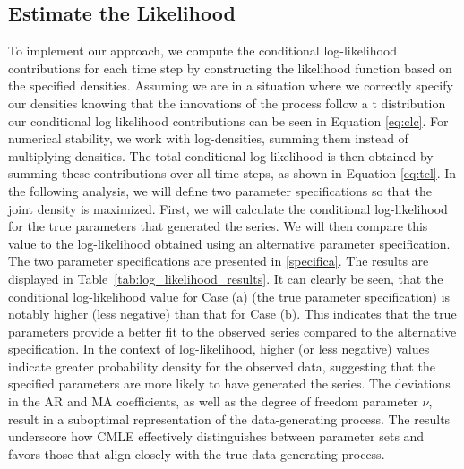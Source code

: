 \documentclass[12pt]{article}
\begin{document}
 \subsection{Estimate the Likelihood}
To implement our approach, we compute the conditional log-likelihood contributions for each time step by constructing the likelihood function based on the specified densities. 
Assuming we are in a situation where we correctly specify our densities knowing that the innovations of the process follow a t distribution our conditional log likelihood contributions can be seen in Equation \eqref{eq:clc}.
For numerical stability, we work with log-densities, summing them instead of multiplying densities. 
The total conditional log likelihood is then obtained by summing these contributions over all time steps, as shown in Equation \eqref{eq:tcl}.
In the following analysis, we will define two parameter specifications so that the joint density is maximized.
First, we will calculate the conditional log-likelihood for the true parameters that generated the series. 
We will then compare this value to the log-likelihood obtained using an alternative parameter specification. The two parameter specifications are presented in \ref{specifica}. The results are displayed in Table~\ref{tab:log_likelihood_results}.
It can clearly be seen, that the conditional log-likelihood value for Case (a) (the true parameter specification) is notably higher (less negative) than that for Case (b). This indicates that the true parameters provide a better fit to the observed series compared to the alternative specification.
In the context of log-likelihood, higher (or less negative) values indicate greater probability density for the observed data, suggesting that the specified parameters are more likely to have generated the series.
The deviations in the AR and MA coefficients, as well as the degree of freedom parameter $\nu$, result in a suboptimal representation of the data-generating process. 
The results underscore how CMLE effectively distinguishes between parameter sets and favors those that align closely with the true data-generating process.
\end{document}
